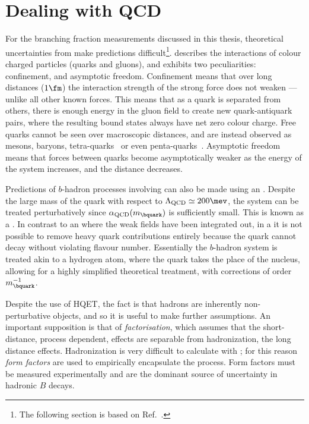\section{Dealing with QCD}

For the branching fraction measurements discussed in this thesis, theoretical uncertainties from \QCD make
predictions difficult\footnote{
  The following section is based on Ref.~\cite{Pich:1998xt}.
}.
\QCD describes the interactions of colour charged particles (quarks and
gluons),
and exhibits two peculiarities: confinement, and asymptotic freedom.
Confinement means that over long distances (\approx$1\fm$)
the interaction strength of the strong force does not weaken --- unlike all other known
forces.
This means that as a quark is separated from others, there is enough energy in the gluon field to
create new quark-antiquark pairs, where the resulting bound states always have net zero colour
charge.
Free quarks cannot be seen over macroscopic distances,
and are instead observed as mesons, baryons, tetra-quarks~\cite{LHCb-PAPER-2014-014} or
even penta-quarks~\cite{LHCb-PAPER-2015-029}.
Asymptotic freedom means that forces between quarks become asymptotically weaker as the energy of
the system increases, and the distance decreases.

Predictions of $b$-hadron processes involving \QCD can also be made using an \EFT.
Despite the large mass of the \bquark quark with respect to $\Lambda_\mathrm{QCD}\simeq200\mev$,
the system can be treated perturbatively since $\alpha_\mathrm{QCD}(m_\bquark)$ is sufficiently
small.
This is known as a \HQET.
In contrast to an \EFT where the weak fields have been integrated out, in a \HQET
it is not possible to remove heavy quark contributions entirely because the \bquark quark
cannot decay without violating flavour number.
Essentially the $b$-hadron system is treated akin to a hydrogen atom, where the \bquark quark takes
the place of the nucleus, allowing for a highly simplified theoretical treatment, with corrections
of order $m_\bquark^{-1}$.

Despite the use of \gls{HQET}, the fact is that hadrons are inherently non-perturbative objects,
and so it is useful to make further assumptions.
An important supposition is that of \emph{factorisation}, which assumes that the short-distance,
process dependent, \QCD effects are separable from hadronization, the long distance effects.
Hadronization is very difficult to calculate with \QCD; for this reason \emph{form factors} are
used to empirically encapsulate the process.
Form factors must be measured experimentally and are the dominant source of uncertainty in hadronic
$B$ decays.

